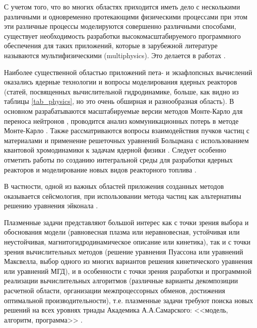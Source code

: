 С учетом того, что во многих областях приходится иметь дело с несколькими различными и одновременно протекающими физическими процессами при этом эти различные процессы моделируются совершенно различными способами, существует необходимость разработки высокомасштабируемого программного обеспечения для таких приложений, которые в зарубежной литературе называются мультифизическими (multiphysics). Это делается в работах \cite{Yamamoto2014576,Agullo201196,Ettrich20151,Vazquez2016,
	Liu2011261,Zheng2015313}.

Наиболее существенной областью приложений пета- и экзафлопсных вычислений оказались ядерные технологии и вопросы моделирования ядерных реакторов (статей, посвященных вычислительной гидродинамике, больше, как видно из таблицы \ref{tab_physics}, но это очень обширная и разнообразная область). В основном разрабатываются масштабируемые версии методов Монте-Карло для переноса нейтронов \cite{Romano2013274,Romano201320,Romano201590,Boyd201443,Gong2012588,Gong20116010,Bergmann2015176,Bauge201432}, проводится анализ коммуникационных потерь в методе Монте-Карло \cite{Siegel20123119,Horelik2014646,Tramm2016}. Также рассматриваются вопросы взаимодействия пучков частиц с материалами \cite{Bandura20103485} и применение решеточных уравнений Больцмана с использованием квантовой хромодинамики к задачам ядерной физики \cite{Beane20111,Savage2012140}.
Следует особенно отметить работы по созданию интегральной среды для разработки ядерных реакторов \cite{Patterson201697} и моделирование новых видов реакторного топлива \cite{Stan200920}.

В частности, одной из важных областей приложения созданных методов оказывается сейсмология, при использовании метода частиц
\cite{hockney,VshivkovPICbook} как альтернативы решению уравнения эйконала \cite{Engquist}.

Плазменные задачи представляют большой интерес как с точки зрения выбора и обоснования модели (равновесная плазма или неравновесная, устойчивая или неустойчивая, магнитогидродинамическое описание или кинетика), так и с точки зрения  вычислительных методов (решение уравнения Пуассона или уравнений Максвелла, выбор одного из многих вариантов решения кинетического уравнения или уравнений МГД), и в особенности с точки зрения разработки и программной реализации вычислительных алгоритмов (различные варианты декомпозиции расчетной области, организации межпроцессорных обменов, достижения оптимальной производительности), т.е. плазменные задачи требуют поиска новых решений на всех уровнях триады Академика А.А.Самарского: <<модель, алгоритм, программа>> \cite{SamarskiMatMod}.  
 
